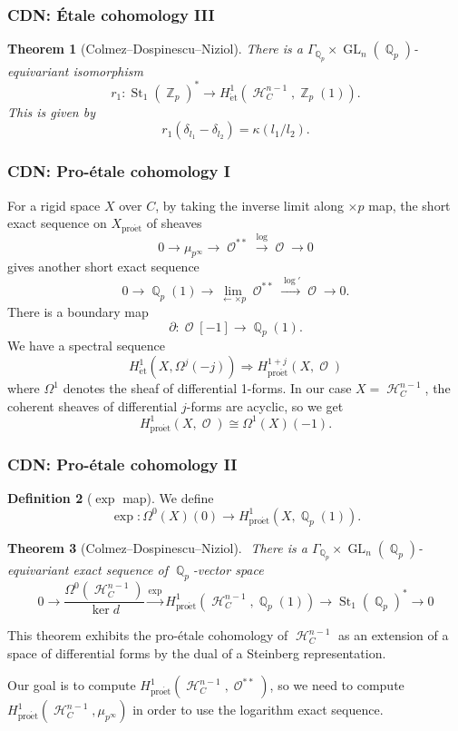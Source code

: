 \documentclass{beamer}
\newtheorem{thm}{Theorem}
\theoremstyle{definition}
\newtheorem{defn}[thm]{Definition}
\newcommand{\pet}{\operatorname{pro\acute{e}t}}
\newcommand{\et}{\operatorname{\acute{e}t}}
\newcommand{\St}{\operatorname{St}}
\newcommand{\GL}{\operatorname{GL}}
\newcommand{\OO}{\operatorname{\mathcal{O}}}
\newcommand{\ZZ}{\operatorname{\mathbb{Z}}}
\newcommand{\QQ}{\operatorname{\mathbb{Q}}}
\newcommand{\HH}{\operatorname{\mathcal{H}}}
\begin{document}
\begin{frame}
\frametitle{CDN: \'Etale cohomology III}
\label{CDNr}
\begin{thm}[Colmez--Dospinescu--Niziol]
	There is a $\Gamma_{\QQ_p} \times \GL_n(\QQ_p)$-equivariant isomorphism $$r_1: \St_1(\ZZ_p)^* \to H_{\et}^1(\HH_C^{n - 1}, \ZZ_p(1)).$$ This is given by $$r_1(\delta_{l_1} - \delta_{l_2}) = \kappa(l_1/l_2).$$
\end{thm}

\end{frame}

\begin{frame}%
\frametitle{CDN: Pro-\'etale cohomology I}
For a rigid space $X$ over $C$, by taking the inverse limit along $\times p$ map, the short exact sequence on $X_{\pet}$ of sheaves $$0 \to \mu_{p^{\infty}} \to \OO^{**} \xrightarrow{\log} \OO \to 0$$ gives another short exact sequence $$0 \to \QQ_p(1) \to \lim_{\leftarrow \times p}\OO^{**} \xrightarrow{\log '} \OO \to 0.$$ There is a boundary map $$\partial: \OO[-1] \to \QQ_p(1).$$
We have a spectral sequence $$H_{\et}^1(X, \Omega^j(-j)) \Rightarrow H^{1 + j}_{\pet}(X, \OO)$$ where $\Omega^1$ denotes the sheaf of differential 1-forms. 
In our case $X = \HH_C^{n - 1}$, the coherent sheaves of differential $j$-forms are acyclic, so we get $$H^1_{\pet}(X, \OO) \cong \Omega^1(X)(-1).$$ 
\end{frame}

\begin{frame}
\frametitle{CDN: Pro-\'etale cohomology II}
\begin{defn}[$\exp$ map] We define
 	$$\exp: \Omega^0(X)(0) \to H^1_{\pet}(X, \QQ_p(1)).$$ 
 \end{defn}


\begin{thm}[Colmez--Dospinescu--Niziol]\label{CDNform}
$\label{524}$
	There is a $\Gamma_{\QQ_p} \times \GL_n(\QQ_p)$-equivariant exact sequence of $\QQ_p$-vector space	
	$$0 \to \frac{\Omega^{0}(\HH_C^{n - 1})}{\ker d} \xrightarrow{\exp} H^1_{\pet}(\HH_C^{n - 1}, \QQ_p(1)) \to \St_1(\QQ_p)^* \to 0$$
\end{thm}
This theorem exhibits the pro-\'etale cohomology of $\HH_C^{n - 1}$ as an extension of a space of differential forms by the dual of a Steinberg representation.

Our goal is to compute $H^1_{\pet}(\HH_C^{n - 1}, \OO^{**})$, so we need to compute $H^1_{\pet}(\HH_C^{n - 1}, \mu_{p^\infty})$ in order to use the logarithm exact sequence.
\end{frame}
\end{document}
